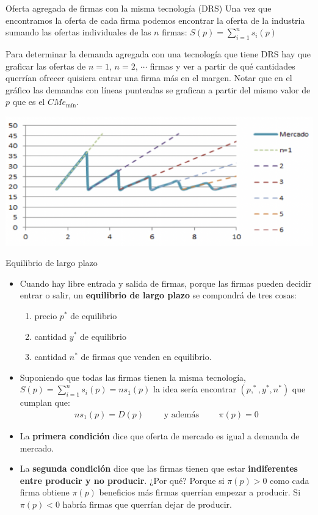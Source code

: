 \documentclass{beamer}
\theoremstyle{definition}
\begin{document}
\begin{frame}{Oferta agregada de firmas con la misma tecnología (DRS)}
\small Una vez que encontramos la oferta de cada firma podemos encontrar la oferta de la industria sumando las ofertas individuales de las $n$ firmas: $S(p) = \sum_{i=1}^{n}s_{i}(p)$
    
 \medskip Para determinar la demanda agregada con una tecnología que tiene DRS  hay que graficar las ofertas de $n=1$, $n=2$, $\cdots$ firmas y ver a partir de qué cantidades querrían ofrecer quisiera entrar una firma más en el margen. Notar que en el gráfico las demandas con líneas punteadas se grafican a partir del mismo valor de $p$ que es el $CMe_{\text{mín}}$.


    \begin{center}
\includegraphics[scale=0.5]{figures5/ofertaagregadaDRS.png}
\end{center}
\end{frame}

\begin{frame}{Equilibrio de largo plazo}\small
\begin{itemize}[leftmargin=*]
 \item   Cuando hay libre entrada y salida de firmas, porque las firmas pueden decidir entrar o salir, un \textbf{equilibrio de largo plazo} se compondrá de tres cosas:
    \begin{enumerate}
    \item precio $p^*$ de equilibrio
    \item cantidad $y^*$ de equilibrio
    \item cantidad $n^*$ de firmas que venden en equilibrio.
    \end{enumerate}
    \item Suponiendo que todas las firmas tienen la misma tecnología, $S(p) = \sum_{i=1}^{n}s_{i}(p)=ns_1(p)$ 
    la idea sería encontrar $(p,^*,y^*,n^*)$ que cumplan que:    
\begin{align*}
    ns_1(p)=D(p) \qquad \text{ y además } \qquad \pi(p)=0
\end{align*}
\item La \textbf{primera condición} dice que oferta de mercado es igual a demanda de mercado. 
\item La \textbf{segunda condición} dice que las firmas tienen que estar \textbf{indiferentes entre producir y no producir}. ¿Por qué? Porque si $\pi(p)>0$ como cada firma obtiene $\pi(p)$ beneficios más firmas querrían empezar a producir. Si $\pi(p)<0$ habría firmas que querrían dejar de producir.
    
    \end{itemize}
\end{frame}
\end{document}
